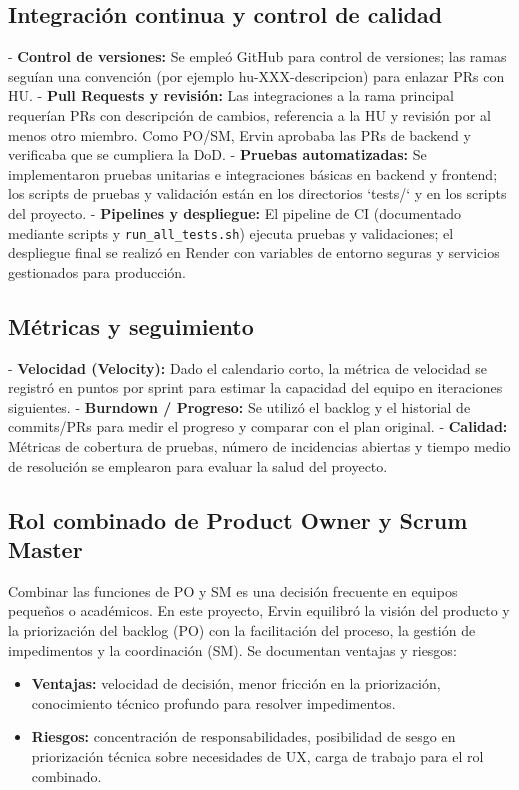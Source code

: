 \documentclass[12pt]{article}
\begin{document}
\subsection{Integración continua y control de calidad}
- \textbf{Control de versiones:} Se empleó GitHub para control de versiones; las ramas seguían una convención (por ejemplo hu-XXX-descripcion) para enlazar PRs con HU.
- \textbf{Pull Requests y revisión:} Las integraciones a la rama principal requerían PRs con descripción de cambios, referencia a la HU y revisión por al menos otro miembro. Como PO/SM, Ervin aprobaba las PRs de backend y verificaba que se cumpliera la DoD.
- \textbf{Pruebas automatizadas:} Se implementaron pruebas unitarias e integraciones básicas en backend y frontend; los scripts de pruebas y validación están en los directorios `tests/` y en los scripts del proyecto.
- \textbf{Pipelines y despliegue:} El pipeline de CI (documentado mediante scripts y \texttt{run\_all\_tests.sh}) ejecuta pruebas y validaciones; el despliegue final se realizó en Render con variables de entorno seguras y servicios gestionados para producción.

\subsection{Métricas y seguimiento}
- \textbf{Velocidad (Velocity):} Dado el calendario corto, la métrica de velocidad se registró en puntos por sprint para estimar la capacidad del equipo en iteraciones siguientes.
- \textbf{Burndown / Progreso:} Se utilizó el backlog y el historial de commits/PRs para medir el progreso y comparar con el plan original.
- \textbf{Calidad:} Métricas de cobertura de pruebas, número de incidencias abiertas y tiempo medio de resolución se emplearon para evaluar la salud del proyecto.

\subsection{Rol combinado de Product Owner y Scrum Master}
Combinar las funciones de PO y SM es una decisión frecuente en equipos pequeños o académicos. En este proyecto, Ervin equilibró la visión del producto y la priorización del backlog (PO) con la facilitación del proceso, la gestión de impedimentos y la coordinación (SM). Se documentan ventajas y riesgos:
\begin{itemize}
  \item \textbf{Ventajas:} velocidad de decisión, menor fricción en la priorización, conocimiento técnico profundo para resolver impedimentos.
  \item \textbf{Riesgos:} concentración de responsabilidades, posibilidad de sesgo en priorización técnica sobre necesidades de UX, carga de trabajo para el rol combinado.
\end{itemize}
\end{document}
